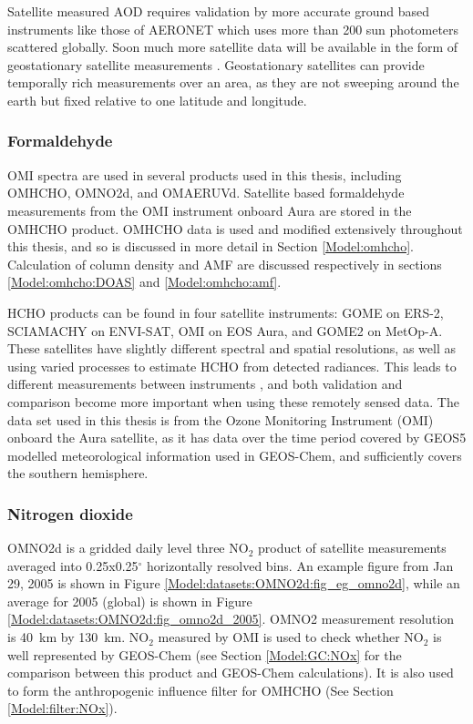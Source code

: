     Satellite measured AOD requires validation by more accurate ground based instruments like those of AERONET which uses more than 200 sun photometers scattered globally.
    Soon much more satellite data will be available in the form of geostationary satellite measurements \parencite{Kwon2017}.
    Geostationary satellites can provide temporally rich measurements over an area, as they are not sweeping around the earth but fixed relative to one latitude and longitude.
    
    \subsubsection{Formaldehyde}
      
      OMI spectra are used in several products used in this thesis, including OMHCHO, OMNO2d, and OMAERUVd.
      Satellite based formaldehyde measurements from the OMI instrument onboard Aura are stored in the OMHCHO product.
      OMHCHO data is used and modified extensively throughout this thesis, and so is discussed in more detail in Section \ref{Model:omhcho}.
      Calculation of column density and AMF are discussed respectively in sections \ref{Model:omhcho:DOAS} and \ref{Model:omhcho:amf}.
      
      HCHO products can be found in four satellite instruments: GOME on ERS-2, SCIAMACHY on ENVI-SAT, OMI on EOS Aura, and GOME2 on MetOp-A.
      These satellites have slightly different spectral and spatial resolutions, as well as using varied processes to estimate HCHO from detected radiances.
      This leads to different measurements between instruments \parencite{Lorente2017}, and both validation and comparison become more important when using these remotely sensed data.
      The data set used in this thesis is from the Ozone Monitoring Instrument (OMI) onboard the Aura satellite, as it has data over the time period covered by GEOS5 modelled meteorological information used in GEOS-Chem, and sufficiently covers the southern hemisphere.
      
    \subsubsection{Nitrogen dioxide}
      \label{Model:datasets:OMNO2d}
      OMNO2d is a gridded daily level three NO$_2$ product of satellite measurements averaged into 0.25x0.25$^{\circ}$ horizontally resolved bins.
      An example figure from Jan 29, 2005 is shown in Figure \ref{Model:datasets:OMNO2d:fig_eg_omno2d}, while an average for 2005 (global) is shown in Figure \ref{Model:datasets:OMNO2d:fig_omno2d_2005}.
      OMNO2 measurement resolution is 40~km by 130~km.
      NO$_2$ measured by OMI is used to check whether NO$_2$ is well represented by GEOS-Chem (see Section \ref{Model:GC:NOx} for the comparison between this product and GEOS-Chem calculations).
      It is also used to form the anthropogenic influence filter for OMHCHO (See Section \ref{Model:filter:NOx}).
      
